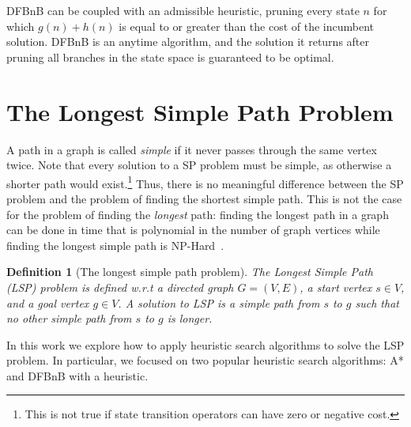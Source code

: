 \documentclass[letterpaper]{article} %
\newcommand\Yossi[1]{\nb{\textbf{Yossi:}}{green}{#1}}
\newcommand\Roni[1]{\nb{\textbf{Roni:}}{blue}{#1}}
\newtheorem{definition}{Definition}
\begin{document}
DFBnB can be coupled with an admissible heuristic, pruning every state $n$ for which $g(n)+h(n)$ is equal to or greater than
the cost of the incumbent solution. DFBnB is an anytime algorithm, and the solution it returns after pruning all branches in the state space is guaranteed to be optimal.



\section{The Longest Simple Path Problem}
A path in a graph is called \emph{simple} if it never passes through the same vertex twice. Note that every solution to a SP problem must be simple, as otherwise a shorter path would exist.\footnote{This is not true if state transition operators can have zero or negative cost.} Thus, there is no meaningful difference between the SP problem and the problem of finding the shortest simple path. This is not the case for the problem of finding the \emph{longest} path: finding the longest path in a graph can be done in time that is polynomial in the number of graph vertices while finding the longest simple path is NP-Hard~\cite{karger1997approximating}.


\begin{definition}[The longest simple path problem]
The Longest Simple Path (LSP) problem is defined w.r.t a directed graph $G=(V,E)$, a start vertex $s\in V$, and a goal vertex $g\in V$. A solution to LSP is a simple path from $s$ to $g$ such that no other simple path from $s$ to $g$ is longer.
\end{definition}

In this work we explore how to apply heuristic search algorithms to solve the LSP problem.
In particular, we focused on two popular heuristic search algorithms: A* and DFBnB with a heuristic.
\end{document}

